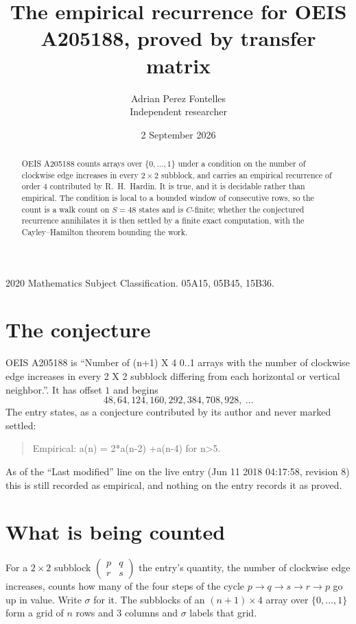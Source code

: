 \documentclass[11pt,a4paper]{article}
\title{The empirical recurrence for OEIS A205188, proved by transfer matrix}
\author{Adrian Perez Fontelles\\ \small Independent researcher}
\date{2 September 2026}
\theoremstyle{plain}
\theoremstyle{definition}
\begin{document}
\maketitle

\begin{abstract}
OEIS A205188 counts arrays over $\{0,\dots,1\}$ under a condition on the number of clockwise edge increases
in every $2\times2$ subblock, and carries an empirical recurrence of order $4$ contributed by
R.~H.~Hardin. It is true, and it is decidable rather than empirical. The condition is local to
a bounded window of consecutive rows, so the count is a walk count on $S=48$ states and is
$C$-finite; whether the conjectured recurrence annihilates it is then settled by a finite exact
computation, with the Cayley--Hamilton theorem bounding the work.
\end{abstract}

\noindent\small 2020 Mathematics Subject Classification. 05A15, 05B45, 15B36.\normalsize

\section{The conjecture}

OEIS A205188 is ``Number of (n+1) X 4 0..1 arrays with the number of clockwise edge increases in every 2 X 2 subblock differing from each horizontal or vertical neighbor.''. It has offset $1$ and begins
\[
48, 64, 124, 160, 292, 384, 708, 928,\ \dots
\]
The entry states, as a conjecture contributed by its author and never marked settled:
\begin{quote}
Empirical: a(n) = 2*a(n-2) +a(n-4) for n>5.
\end{quote}
As of the ``Last modified'' line on the live entry (Jun 11 2018 04:17:58, revision 8) this is still
recorded as empirical, and nothing on the entry records it as proved.

\section{What is being counted}

For a $2\times2$ subblock $\begin{pmatrix}p&q\\r&s\end{pmatrix}$ the
entry's quantity, the number of clockwise edge increases, counts how many of the four steps of the cycle $p\to q\to s\to r\to p$ go up in value. Write $\sigma$ for it. The subblocks of an
$(n+1)\times4$ array over $\{0,\dots,1\}$ form a grid of $n$ rows and $3$
columns and $\sigma$ labels that grid.
\end{document}
